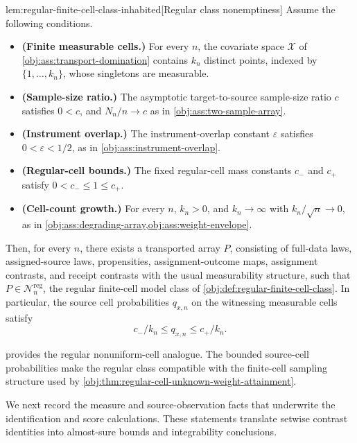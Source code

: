 \begin{lemmav}{lem:regular-finite-cell-class-inhabited}[Regular class nonemptiness]
Assume the following conditions.
\begin{itemize}
\item \textbf{(Finite measurable cells.)} For every \(n\), the covariate space \(\mathcal X\) of \cref{obj:ass:transport-domination} contains \(k_n\) distinct points, indexed by \(\{1,\ldots,k_n\}\), whose singletons are measurable.
\item \textbf{(Sample-size ratio.)} The asymptotic target-to-source sample-size ratio \(c\) satisfies \(0<c\), and \(N_n/n\to c\) as in \cref{obj:ass:two-sample-array}.
\item \textbf{(Instrument overlap.)} The instrument-overlap constant \(\varepsilon\) satisfies \(0<\varepsilon<1/2\), as in \cref{obj:ass:instrument-overlap}.
\item \textbf{(Regular-cell bounds.)} The fixed regular-cell mass constants \(c_-\) and \(c_+\) satisfy \(0<c_-\le 1\le c_+\).
\item \textbf{(Cell-count growth.)} For every \(n\), \(k_n>0\), and \(k_n\to\infty\) with \(k_n/\sqrt n\to 0\), as in \cref{obj:ass:degrading-array,obj:ass:weight-envelope}.
\end{itemize}
Then, for every \(n\), there exists a transported array \(P\), consisting of full-data laws, assigned-source laws, propensities, assignment-outcome maps, assignment contrasts, and receipt contrasts with the usual measurability structure, such that \(P\in\mathcal N_n^{\mathrm{reg}}\), the regular finite-cell model class of \cref{obj:def:regular-finite-cell-class}. In particular, the source cell probabilities \(q_{x,n}\) on the witnessing measurable cells satisfy
\[
c_-/k_n\le q_{x,n}\le c_+/k_n .
\]
\end{lemmav}

 provides the regular nonuniform-cell analogue. The bounded source-cell probabilities make the regular class compatible with the finite-cell sampling structure used by \cref{obj:thm:regular-cell-unknown-weight-attainment}.

We next record the measure and source-observation facts that underwrite the identification and score calculations. These statements translate setwise contrast identities into almost-sure bounds and integrability conclusions.

